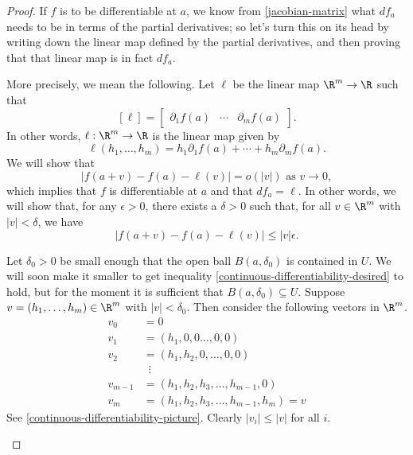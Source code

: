 \begin{proof}
	If $f$ is to be differentiable at $a$, we know from \cref{jacobian-matrix} what $df_a$ needs to be in terms of the partial derivatives; so let's turn this on its head by writing down the linear map defined by the partial derivatives, and then proving that that linear map is in fact $df_a$. 
	
	More precisely, we mean the following. Let $\ell$ be the linear map $\R^m \to \R$ such that \[ [\ell] = \begin{bmatrix}
	\partial_1f(a) & \dotsb & \partial_m f(a)
	\end{bmatrix}. \]
	In other words, $\ell : \R^m \to \R$ is the linear map given by
	\[ \ell(h_1, \dotsc, h_m) = h_1 \partial_1 f(a) + \dotsb + h_m \partial_m f(a). \]
	We will show that 
	\[ |f(a+v) - f(a) - \ell(v)| = o(|v|) \text{ as } v \to 0, \]
	which implies that $f$ is differentiable at $a$ and that $df_a = \ell$. In other words, we will show that, for any $\epsilon > 0$, there exists a $\delta > 0$ such that, for all $v \in \R^m$ with $|v| < \delta$, we have
	\begin{equation} \label{continuous-differentiability-desired} |f(a+v) - f(a) - \ell(v)| \leq |v|\epsilon. \end{equation}
	
	Let $\delta_0 > 0$ be small enough that the open ball $B(a, \delta_0)$ is contained in $U$. We will soon make it smaller to get inequality \eqref{continuous-differentiability-desired} to hold, but for the moment it is sufficient that $B(a, \delta_0) \subseteq U$. 
	Suppose $v = (h_1, \dotsc, h_m) \in \R^m$ with $|v| < \delta_0$. Then consider the following vectors in $\R^m$. 
	\[ \begin{aligned} 
	v_0 &= 0 \\
	v_1 &= (h_1, 0, 0 \dotsc, 0, 0) \\
	v_2 &= (h_1, h_2, 0, \dotsc, 0, 0) \\
	&\enspace \vdots \\
	v_{m-1} &= (h_1, h_2, h_3, \dotsc, h_{m-1}, 0) \\
	v_m &= (h_1, h_2, h_3, \dotsc, h_{m-1}, h_m) = v \end{aligned} \]
	See \cref{continuous-differentiability-picture}. 
	Clearly $|v_i| \leq |v|$ for all $i$. 
	\begin{figure}
		\begin{center}
\end{center}
\end{figure}
\end{proof}
